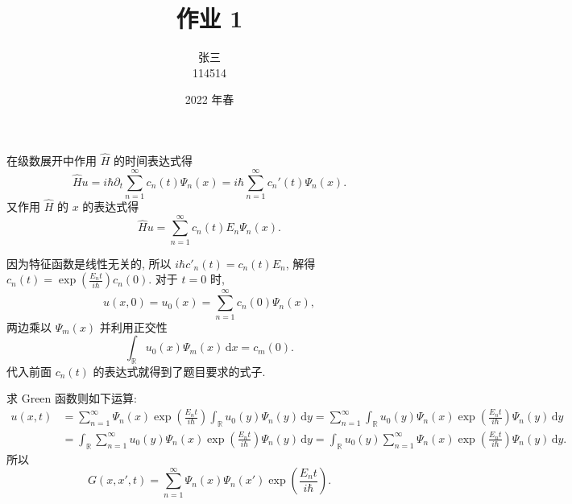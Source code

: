 \documentclass[11pt]{article}
\title{\textbf{作业 1}}
\author{张三 \\ 114514}
\date{2022 年春}
\begin{document}
    \maketitle

    \begin{hwsol}
        在级数展开中作用 $\hat H$ 的时间表达式得
        \[ \hat Hu=i \hbar \partial_t \sum_{n=1}^\infty c_n(t) \Psi_n(x)=i \hbar \sum_{n=1}^\infty c_n'(t) \Psi_n(x). \]
        又作用 $\hat H$ 的 $x$ 的表达式得
        \[ \hat H u = \sum_{n=1}^\infty c_n(t)E_n \Psi_n(x). \]
        
        因为特征函数是线性无关的, 所以 $i \hbar c'_n(t)=c_n(t)E_n$, 解得 $c_n(t) = \exp \left(\frac{E_nt}{i \hbar}\right)c_n(0)$. 对于 $t=0$ 时,
        \[ u(x, 0)=u_0(x) = \sum_{n=1}^\infty c_n(0) \Psi_n(x), \]
        两边乘以 $\Psi_m(x)$ 并利用正交性
        \[ \int_{\mathbb R} u_0(x) \Psi_m(x)\,\mathrm dx=c_m(0). \]
        代入前面 $c_n(t)$ 的表达式就得到了题目要求的式子.
        
        求 Green 函数则如下运算:
        \begin{align*}
            u(x, t) &= \sum_{n=1}^\infty \Psi_n(x) \exp \left(\frac{E_nt}{i \hbar}\right) \int_{\mathbb R} u_0(y) \Psi_n(y)\,\mathrm dy = \sum_{n=1}^\infty \int_{\mathbb R} u_0(y) \Psi_n(x) \exp \left(\frac{E_nt}{i \hbar}\right) \Psi_n(y)\,\mathrm dy
            \\&= \int_{\mathbb R} \sum_{n=1}^\infty u_0(y) \Psi_n(x) \exp \left(\frac{E_nt}{i \hbar}\right) \Psi_n(y)\,\mathrm dy = \int_{\mathbb R} u_0(y) \sum_{n=1}^\infty \Psi_n(x) \exp \left(\frac{E_nt}{i \hbar}\right) \Psi_n(y)\,\mathrm dy.
        \end{align*}
        所以
        \[ G(x, x', t) = \sum_{n=1}^\infty \Psi_n(x) \Psi_n(x') \exp \left(\frac{E_nt}{i \hbar} \right). \]
    \end{hwsol}
\end{document}

